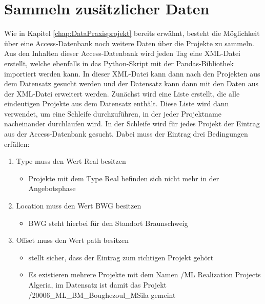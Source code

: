 \section{Sammeln zusätzlicher Daten}
\label{chap:DatenSammeln}
Wie in Kapitel \ref*{chap:DataPraxisprojekt} bereits erwähnt, besteht die Möglichkeit über eine Access-Datenbank noch weitere Daten über die Projekte zu sammeln.
Aus den Inhalten dieser Access-Datenbank wird jeden Tag eine XML-Datei erstellt, welche ebenfalls in das Python-Skript mit der Pandas-Bibliothek importiert werden kann.
In dieser XML-Datei kann dann nach den Projekten aus dem Datensatz gesucht werden und der Datensatz kann dann mit den Daten aus der XML-Datei erweitert werden.
Zunächst wird eine Liste erstellt, die alle eindeutigen Projekte aus dem Datensatz enthält. Diese Liste wird dann verwendet, um eine Schleife durchzuführen, 
in der jeder Projektname nacheinander durchlaufen wird. In der Schleife wird für jedes Projekt der Eintrag aus der Access-Datenbank gesucht.
Dabei muss der Eintrag drei Bedingungen erfüllen:
\begin{enumerate}[topsep=0pt,itemsep=-1ex,partopsep=1ex,parsep=1ex]
    \item \glqq Type\grqq{} muss den Wert \glqq Real\grqq{} besitzen
        \begin{itemize}[itemindent=0cm]
            \item Projekte mit dem \glqq Type\grqq{} \glqq Real\grqq{} befinden sich nicht mehr in der Angebotsphase
        \end{itemize}
    \item \glqq Location\grqq{} muss den Wert \glqq BWG\grqq{} besitzen
        \begin{itemize}[itemindent=0cm]
            \item \glqq BWG\grqq{} steht hierbei für den Standort Braunschweig
        \end{itemize}
    \item \glqq Offset\grqq{} muss den Wert \glqq path\grqq{} besitzen
        \begin{itemize}[itemindent=0cm]
            \item stellt sicher, dass der Eintrag zum richtigen Projekt gehört
            \item Es existieren mehrere Projekte mit dem Namen \glqq /ML Realization Projects Algeria\grqq{}, im Datensatz ist damit das Projekt \glqq /20006\_ML\_BM\_Boughezoul\_MSila\grqq{} gemeint
        \end{itemize}
\end{enumerate}
